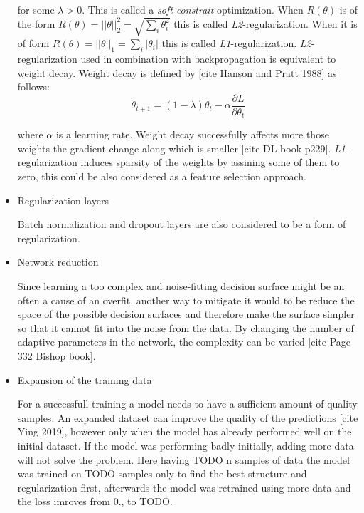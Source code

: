 \begin{itemize}
	for some $\lambda > 0$. This is called a \emph{soft-constrait} optimization. When $R(\theta)$ is of the form $R(\theta) = ||\theta||^2_2 = \sqrt{\sum\limits_i \theta_i^2}$ this is called \emph{L2}-regularization. When it is of form $R(\theta) = ||\theta||_1 = \sum\limits_i |\theta_i|$ this is called \emph{L1}-regularization. \emph{L2}-regularization used in combination with backpropagation is equivalent to weight decay. Weight decay is defined by [cite Hanson and Pratt 1988] as follows:
	\begin{equation}
		\theta_{t+1} = (1 - \lambda)\theta_t - \alpha \frac{\partial L}{\partial \theta_t}
	\end{equation}

	where $\alpha$ is a learning rate. Weight decay successfully affects more those weights the gradient change along which is smaller [cite DL-book p229]. \emph{L1}-regularization induces sparsity of the weights by assining some of them to zero, this could be also considered as a feature selection approach.

	\item Regularization layers

	Batch normalization and dropout layers are also considered to be a form of regularization. 

	\item Network reduction
	
	Since learning a too complex and noise-fitting decision surface might be an often a cause of an overfit, another way to mitigate it would to be reduce the space of the possible decision surfaces and therefore make the surface simpler so that it cannot fit into the noise from the data. By changing the number of adaptive parameters in the network, the complexity can be varied [cite Page 332 Bishop book].

	\item Expansion of the training data

	For a successfull training a model needs to have a sufficient amount of quality samples. An expanded dataset can improve the quality of the predictions [cite Ying 2019], however only when the model has already performed well on the initial dataset. If the model was performing badly initially, adding more data will not solve the problem. Here having TODO n samples of data the model was trained on TODO samples only to find the best structure and regularization first, afterwards the model was retrained using more data and the loss imroves from 0., to TODO.
\end{itemize}
